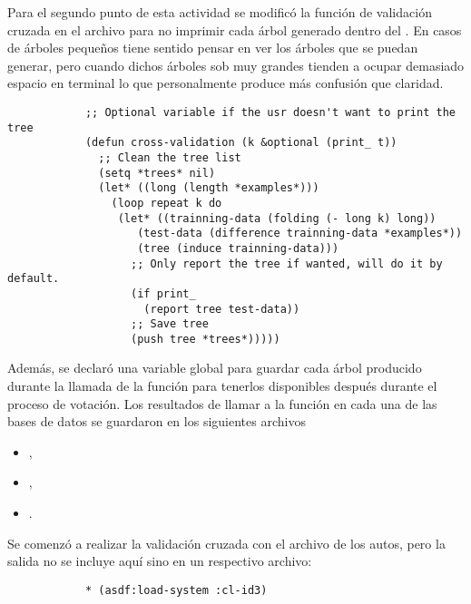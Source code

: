 \begin{itemize}
\begin{solution}
        Para el segundo punto de esta actividad se modificó la función de validación cruzada  en el archivo  para no imprimir cada árbol generado dentro del . En casos de árboles pequeños tiene sentido pensar en ver los árboles que se puedan generar, pero cuando dichos árboles sob muy grandes tienden a ocupar demasiado espacio en terminal lo que personalmente produce más confusión que claridad.
        \begin{verbatim}
            ;; Optional variable if the usr doesn't want to print the tree
            (defun cross-validation (k &optional (print_ t))
              ;; Clean the tree list
              (setq *trees* nil)
              (let* ((long (length *examples*)))
                (loop repeat k do
                 (let* ((trainning-data (folding (- long k) long))
                    (test-data (difference trainning-data *examples*))
                    (tree (induce trainning-data)))
                   ;; Only report the tree if wanted, will do it by default.
                   (if print_
                     (report tree test-data))
                   ;; Save tree
                   (push tree *trees*)))))
        \end{verbatim}

        Además, se declaró una variable global  para guardar cada árbol producido durante la llamada de la función para tenerlos disponibles después durante el proceso de votación. Los resultados de llamar a la función  en cada una de las bases de datos se guardaron en los siguientes archivos
        \begin{itemize}
            \item {},
            \item {},
            \item {}.
        \end{itemize}

        Se comenzó a realizar la validación cruzada con el archivo de los autos, pero la salida no se incluye aquí sino en un respectivo archivo:
        \begin{verbatim}
            * (asdf:load-system :cl-id3)


\end{verbatim}
\end{solution}
\end{itemize}

